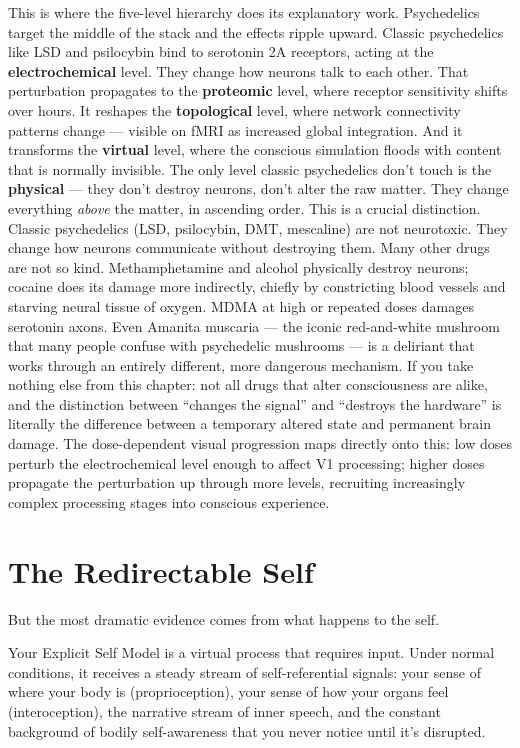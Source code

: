 \documentclass[11pt, twoside, openright]{book}
\begin{document}
This is where the five-level hierarchy does its explanatory work. Psychedelics target the middle of the stack and the effects ripple upward. Classic psychedelics like LSD and psilocybin bind to serotonin 2A receptors, acting at the \textbf{electrochemical} level. They change how neurons talk to each other. That perturbation propagates to the \textbf{proteomic} level, where receptor sensitivity shifts over hours. It reshapes the \textbf{topological} level, where network connectivity patterns change --- visible on fMRI as increased global integration. And it transforms the \textbf{virtual} level, where the conscious simulation floods with content that is normally invisible. The only level classic psychedelics don't touch is the \textbf{physical} --- they don't destroy neurons, don't alter the raw matter. They change everything \textit{above} the matter, in ascending order. This is a crucial distinction. Classic psychedelics (LSD, psilocybin, DMT, mescaline) are not neurotoxic. They change how neurons communicate without destroying them. Many other drugs are not so kind. Methamphetamine and alcohol physically destroy neurons; cocaine does its damage more indirectly, chiefly by constricting blood vessels and starving neural tissue of oxygen. MDMA at high or repeated doses damages serotonin axons. Even Amanita muscaria --- the iconic red-and-white mushroom that many people confuse with psychedelic mushrooms --- is a deliriant that works through an entirely different, more dangerous mechanism. If you take nothing else from this chapter: not all drugs that alter consciousness are alike, and the distinction between ``changes the signal'' and ``destroys the hardware'' is literally the difference between a temporary altered state and permanent brain damage. The dose-dependent visual progression maps directly onto this: low doses perturb the electrochemical level enough to affect V1 processing; higher doses propagate the perturbation up through more levels, recruiting increasingly complex processing stages into conscious experience.

\section*{The Redirectable Self}

But the most dramatic evidence comes from what happens to the self.

Your Explicit Self Model is a virtual process that requires input. Under normal conditions, it receives a steady stream of self-referential signals: your sense of where your body is (proprioception), your sense of how your organs feel (interoception), the narrative stream of inner speech, and the constant background of bodily self-awareness that you never notice until it's disrupted.
\end{document}
